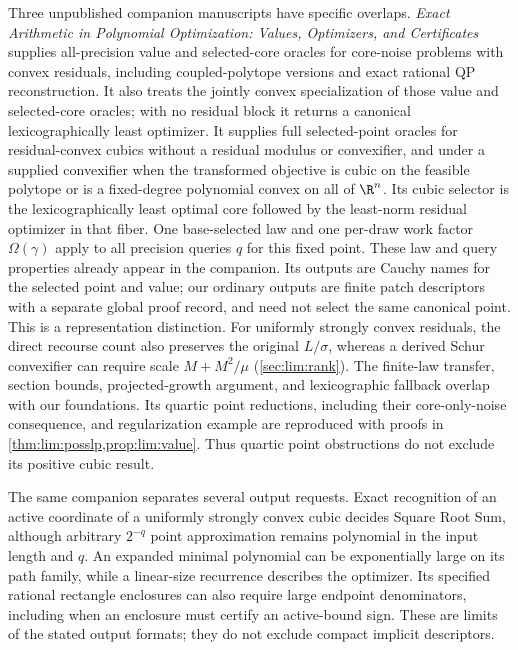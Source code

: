 Three unpublished companion manuscripts have specific overlaps.
\emph{Exact Arithmetic in Polynomial Optimization: Values, Optimizers, and
Certificates}~\citep{companion-exact-arithmetic} supplies all-precision
value and selected-core oracles for core-noise problems with convex
residuals, including coupled-polytope versions and exact rational QP
reconstruction. It also treats the jointly convex specialization of those
value and selected-core oracles; with no residual block it returns a
canonical lexicographically least optimizer. It supplies full selected-point oracles for
residual-convex cubics without a residual modulus or convexifier, and under
a supplied convexifier when the transformed objective is cubic on the
feasible polytope or is a fixed-degree polynomial convex on all of $\R^n$.
Its cubic selector is the lexicographically least optimal core followed by
the least-norm residual optimizer in that fiber. One base-selected law and
one per-draw work factor $\Omega(\gamma)$ apply to all precision queries
$q$ for this fixed point. These law and query properties already appear in
the companion. Its outputs are Cauchy names for the selected point and value;
our ordinary outputs are finite patch descriptors with a separate global
proof record, and need not select the same canonical point. This is a
representation distinction. For uniformly strongly convex residuals, the
direct recourse count also preserves the original $L/\sigma$, whereas a
derived Schur convexifier can require scale $M+M^2/\mu$
(\cref{sec:lim:rank}).
The finite-law transfer, section bounds, projected-growth argument, and
lexicographic fallback overlap with our foundations. Its quartic point
reductions, including their core-only-noise consequence, and regularization
example are reproduced with proofs in
\cref{thm:lim:posslp,prop:lim:value}. Thus quartic point obstructions do not
exclude its positive cubic result.

The same companion separates several output requests. Exact recognition
of an active coordinate of a uniformly strongly convex cubic decides
Square Root Sum, although arbitrary $2^{-q}$ point approximation remains
polynomial in the input length and $q$. An expanded minimal polynomial can
be exponentially large on its path family, while a linear-size recurrence
describes the optimizer. Its specified rational rectangle enclosures can
also require large endpoint denominators, including when an enclosure
must certify an active-bound sign. These are limits of the stated output
formats; they do not exclude compact implicit descriptors.

